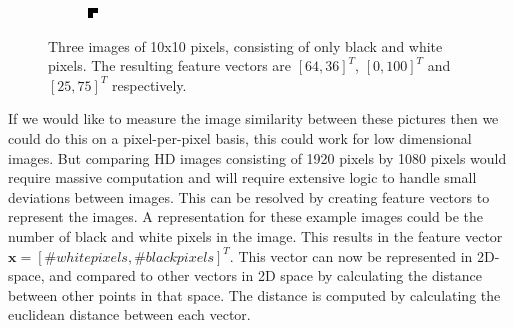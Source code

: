 \documentclass{article}
\begin{document}
\begin{figure}[H]
\begin{subfigure}[b]{0.2\textwidth}
	\end{subfigure}
	\begin{subfigure}[b]{0.2\textwidth}
		\includegraphics[width=\textwidth]{images/mostlyblack.png}
	\end{subfigure}
	\caption{Three images of 10x10 pixels, consisting of only black and white pixels. The resulting feature vectors are $[64,36]^T$, $[0, 100]^T$ and $[25,75]^T$ respectively.}
	\label{featurevectorimages}
\end{figure}

If we would like to measure the image similarity between these pictures then we could do this on a pixel-per-pixel basis, this could work for low dimensional images. But comparing HD images consisting of 1920 pixels by 1080 pixels would require massive computation and will require extensive logic to handle small deviations between images. This can be resolved by creating feature vectors to represent the images. A representation for these example images could be the number of black and white pixels in the image. This results in the feature vector $\textbf{x} = [\# white pixels, \# black pixels]^T$. This vector can now be represented in 2D-space, and compared to other vectors in 2D space by calculating the distance between other points in that space. The distance is computed by calculating the euclidean distance between each vector.
\end{document}

